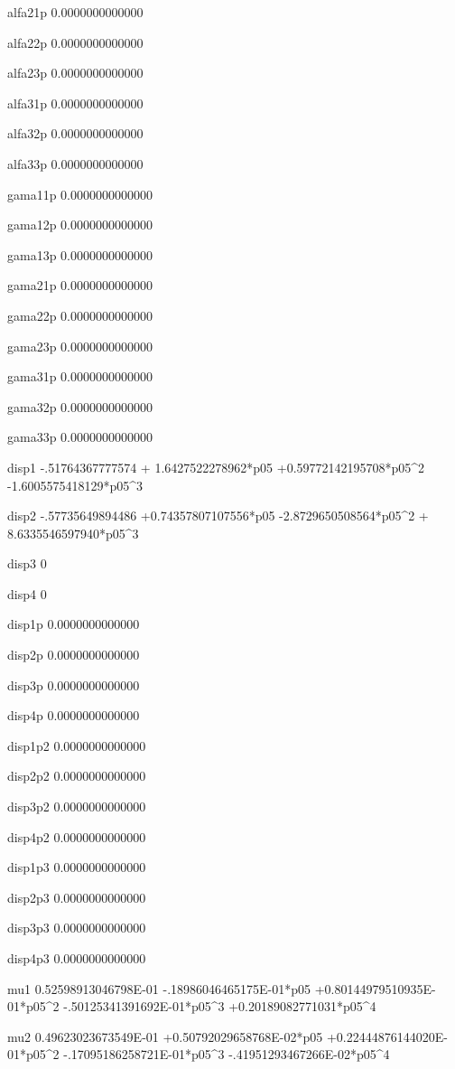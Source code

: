  alfa21p
   0.0000000000000 
  
 alfa22p
   0.0000000000000 
  
 alfa23p
   0.0000000000000 
  
 alfa31p
   0.0000000000000 
  
 alfa32p
   0.0000000000000 
  
 alfa33p
   0.0000000000000 
  
 gama11p
   0.0000000000000 
  
 gama12p
   0.0000000000000 
  
 gama13p
   0.0000000000000 
  
 gama21p
   0.0000000000000 
  
 gama22p
   0.0000000000000 
  
 gama23p
   0.0000000000000 
  
 gama31p
   0.0000000000000 
  
 gama32p
   0.0000000000000 
  
 gama33p
   0.0000000000000 
  
 disp1  
  -.51764367777574 + 1.6427522278962*p05 +0.59772142195708*p05^2  -1.6005575418129*p05^3 
  
 disp2  
  -.57735649894486 +0.74357807107556*p05  -2.8729650508564*p05^2 + 8.6335546597940*p05^3 
  
 disp3  
 0 
  
 disp4  
 0 
  
 disp1p 
   0.0000000000000 
  
 disp2p 
   0.0000000000000 
  
 disp3p 
   0.0000000000000 
  
 disp4p 
   0.0000000000000 
  
 disp1p2
   0.0000000000000 
  
 disp2p2
   0.0000000000000 
  
 disp3p2
   0.0000000000000 
  
 disp4p2
   0.0000000000000 
  
 disp1p3
   0.0000000000000 
  
 disp2p3
   0.0000000000000 
  
 disp3p3
   0.0000000000000 
  
 disp4p3
   0.0000000000000 
  
 mu1    
  0.52598913046798E-01  -.18986046465175E-01*p05 +0.80144979510935E-01*p05^2  -.50125341391692E-01*p05^3 +0.20189082771031*p05^4 
  
 mu2    
  0.49623023673549E-01 +0.50792029658768E-02*p05 +0.22444876144020E-01*p05^2  -.17095186258721E-01*p05^3  -.41951293467266E-02*p05^4 
  
